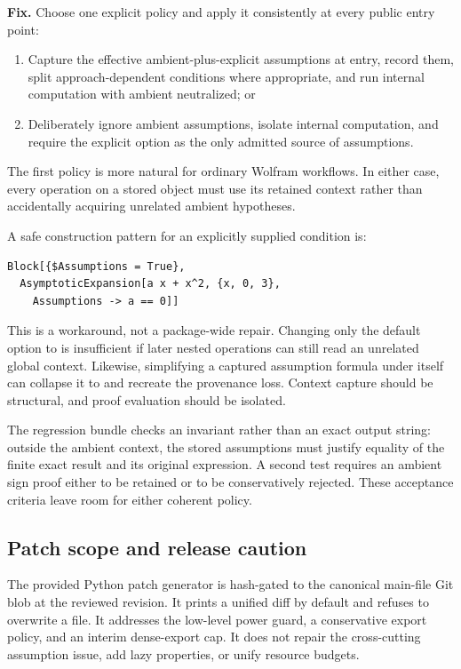 \documentclass[11pt,a4paper]{article}
\newcommand{\code}[1]{\texttt{\detokenize{#1}}}
\theoremstyle{remark}\newtheorem{remark}[proposition]{Remark}
\begin{document}
\textbf{Fix.} Choose one explicit policy and apply it consistently at every public entry point:
\begin{enumerate}
\item Capture the effective ambient-plus-explicit assumptions at entry, record them, split approach-dependent conditions where appropriate, and run internal computation with ambient \code{$Assumptions} neutralized; or
\item Deliberately ignore ambient assumptions, isolate internal computation, and require the explicit option as the only admitted source of assumptions.
\end{enumerate}
The first policy is more natural for ordinary Wolfram workflows. In either case, every operation on a stored object must use its retained context rather than accidentally acquiring unrelated ambient hypotheses.

A safe construction pattern for an explicitly supplied condition is:
\begin{lstlisting}
Block[{$Assumptions = True},
  AsymptoticExpansion[a x + x^2, {x, 0, 3},
    Assumptions -> a == 0]]
\end{lstlisting}
This is a workaround, not a package-wide repair. Changing only the default option to \code{$Assumptions} is insufficient if later nested operations can still read an unrelated global context. Likewise, simplifying a captured assumption formula under itself can collapse it to \code{True} and recreate the provenance loss. Context capture should be structural, and proof evaluation should be isolated.

The regression bundle checks an invariant rather than an exact output string: outside the ambient context, the stored assumptions must justify equality of the finite exact result and its original expression. A second test requires an ambient sign proof either to be retained or to be conservatively rejected. These acceptance criteria leave room for either coherent policy.

\subsection{Patch scope and release caution}
The provided Python patch generator is hash-gated to the canonical main-file Git blob at the reviewed revision. It prints a unified diff by default and refuses to overwrite a file. It addresses the low-level power guard, a conservative export policy, and an interim dense-export cap. It does not repair the cross-cutting assumption issue, add lazy properties, or unify resource budgets.
\end{document}
